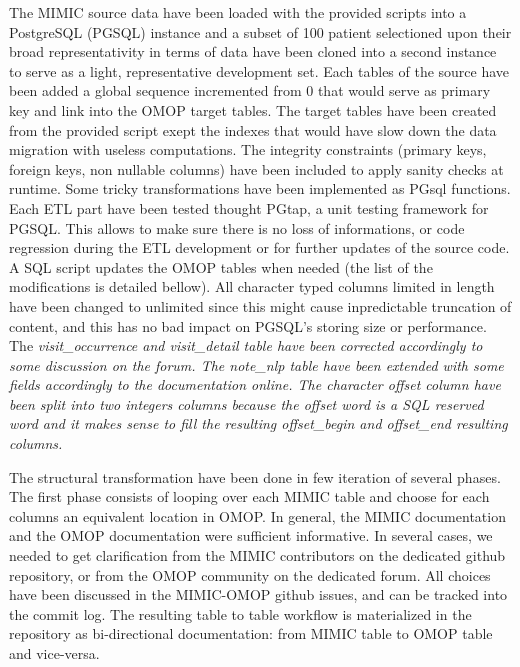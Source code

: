 
The MIMIC source data have been loaded with the provided scripts into a
PostgreSQL (PGSQL) instance and a subset of 100 patient selectioned upon their
broad representativity in terms of data have been cloned into a second instance
to serve as a light, representative development set.
Each tables of the source have been added a global sequence incremented from 0
that would serve as primary key and link into the OMOP target tables. The
target tables have been created from the provided script exept the indexes
that would have slow down the data migration with useless computations. The
integrity constraints (primary keys, foreign keys, non nullable columns) have
been included to apply sanity checks at runtime. Some tricky transformations
have been implemented as PGsql functions.
Each ETL part have been tested thought PGtap, a unit testing framework for PGSQL.
This allows to make sure there is no loss of informations, or code regression
during the ETL development or for further updates of the source code.
A SQL script updates the OMOP tables when needed (the list of the modifications
is detailed bellow). 
All character typed columns limited in length have been changed to unlimited
since this might cause inpredictable truncation of content, and this has no bad
impact on PGSQL's storing size or performance.
The \it{visit\_occurrence} and \it{visit\_detail} table have been corrected
accordingly to some discussion on the forum.
The \it{note\_nlp} table have been extended with some fields accordingly to
the documentation online. The character \it{offset} column have been split into
two integers columns because the offset word is a SQL reserved word and it
makes sense to fill the resulting \it{offset\_begin} and \it{offset\_end}
resulting columns.

The structural transformation have been done in few iteration of several phases.
The first phase consists of looping over each MIMIC table and choose for each
columns an equivalent location in OMOP. In general, the MIMIC documentation and
the OMOP documentation were sufficient informative. In several cases, we needed
to get clarification from the MIMIC contributors on the dedicated github
repository, or from the OMOP community on the dedicated forum.
All choices have been discussed in the MIMIC-OMOP github issues, and can be
tracked into the commit log. The resulting table to table workflow is
materialized in the repository as bi-directional documentation: from MIMIC
table to OMOP table and vice-versa.


